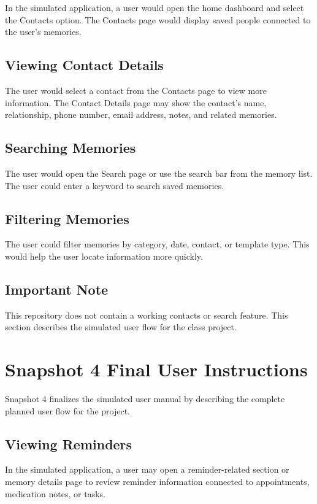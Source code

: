 \documentclass{article}
\begin{document}
In the simulated application, a user would open the home dashboard and select the Contacts option. The Contacts page would display saved people connected to the user's memories.

\subsection{Viewing Contact Details}

The user would select a contact from the Contacts page to view more information. The Contact Details page may show the contact's name, relationship, phone number, email address, notes, and related memories.

\subsection{Searching Memories}

The user would open the Search page or use the search bar from the memory list. The user could enter a keyword to search saved memories.

\subsection{Filtering Memories}

The user could filter memories by category, date, contact, or template type. This would help the user locate information more quickly.

\subsection{Important Note}

This repository does not contain a working contacts or search feature. This section describes the simulated user flow for the class project.

\section{Snapshot 4 Final User Instructions}

Snapshot 4 finalizes the simulated user manual by describing the complete planned user flow for the project.

\subsection{Viewing Reminders}

In the simulated application, a user may open a reminder-related section or memory details page to review reminder information connected to appointments, medication notes, or tasks.
\end{document}
